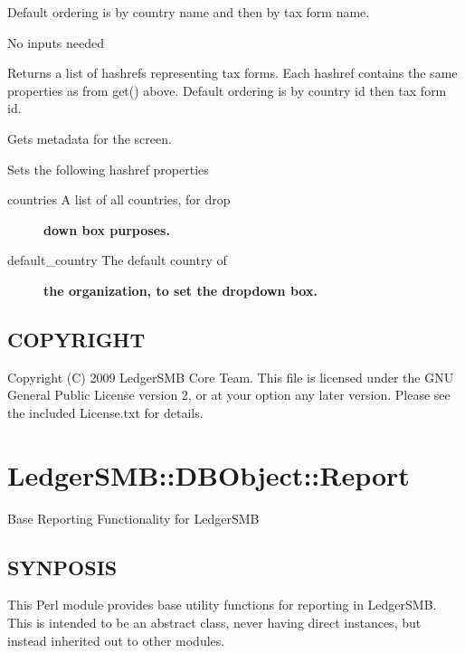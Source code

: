 \begin{description}
\begin{description}
\begin{description}
\begin{description}
\begin{description}
\begin{description}
\begin{description}
\begin{description}
\begin{description}
\begin{description}
\begin{description}
Default ordering is by country name and then by tax form name.


\item[{get\_forms}] \mbox{}

No inputs needed



Returns a list of hashrefs representing tax forms.  Each hashref contains
the same properties as from get() above.  Default ordering is by country id
then tax form id.


\item[{get\_metadata}] \mbox{}

Gets metadata for the screen.



Sets the following hashref properties

\begin{description}

\item[{countries A list of all countries, for drop}] \textbf{down box purposes.}
\item[{default\_country The default country of}] \textbf{the organization, to set the dropdown box.}\end{description}
\end{description}
\subsection*{COPYRIGHT\label{LedgerSMB::DBObject::TaxFormm_COPYRIGHT}}


Copyright (C) 2009 LedgerSMB Core Team.  This file is licensed under the GNU 
General Public License version 2, or at your option any later version.  Please
see the included License.txt for details.

\section{LedgerSMB::DBObject::Report\label{LedgerSMB::DBObject::Report}}


Base Reporting Functionality for LedgerSMB

\subsection*{SYNPOSIS\label{LedgerSMB::DBObject::Report_SYNPOSIS}}


This Perl module provides base utility functions for reporting in LedgerSMB.
This is intended to be an abstract class, never having direct instances, but
instead inherited out to other modules.


\end{description}
\end{description}
\end{description}
\end{description}
\end{description}
\end{description}
\end{description}
\end{description}
\end{description}
\end{description}
